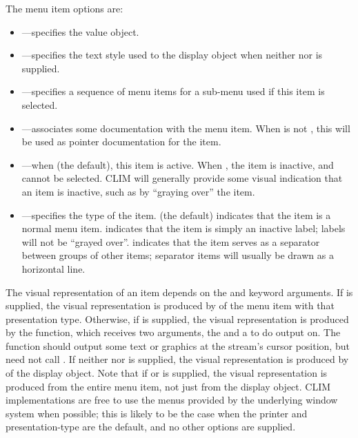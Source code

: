 The menu item options are: 

\begin{itemize}
\item {}---specifies the value object.

\item {}---specifies the text style used to  the display
object when neither  nor  is supplied.

\item {}---specifies a sequence of menu items for a sub-menu used if
this item is selected.
 
\item {}---associates some documentation with the menu item.
When  is not , this will be used as pointer
documentation for the item.

\item {}---when  (the default), this item is active.  When
, the item is inactive, and cannot be selected.  CLIM will generally
provide some visual indication that an item is inactive, such as by ``graying
over'' the item.

\item {}---specifies the type of the item.   (the default)
indicates that the item is a normal menu item.   indicates that the
item is simply an inactive label; labels will not be ``grayed over''.
 indicates that the item serves as a separator between groups of
other items; separator items will usually be drawn as a horizontal line.
\end{itemize}

The visual representation of an item depends on the  and
 keyword arguments.  If  is
supplied, the visual representation is produced by  of the menu item
with that presentation type.  Otherwise, if  is supplied, the visual
representation is produced by the  function, which receives two
arguments, the  and a  to do output on.  The 
function should output some text or graphics at the stream's cursor position, but
need not call .  If neither  nor 
is supplied, the visual representation is produced by  of the display
object.  Note that if  or  is supplied, the
visual representation is produced from the entire menu item, not just from the
display object.  CLIM implementations are free to use the menus provided by the
underlying window system when possible; this is likely to be the case when the
printer and presentation-type are the default, and no other options are supplied.

